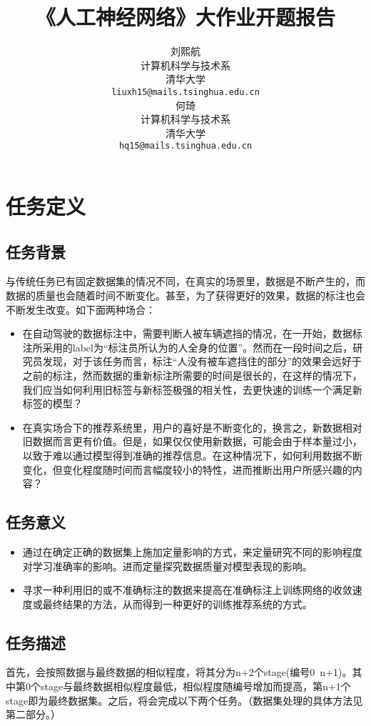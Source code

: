 \documentclass{article}
\title{《人工神经网络》大作业开题报告}
\author{
  刘熙航 \\
  计算机科学与技术系 \\
  清华大学 \\
  \texttt{liuxh15@mails.tsinghua.edu.cn} \\
  \And
  何琦\\
  计算机科学与技术系 \\
  清华大学 \\
  \texttt{hq15@mails.tsinghua.edu.cn} \\
}
\begin{document}
\maketitle



\section{任务定义}
\subsection{任务背景}

与传统任务已有固定数据集的情况不同，在真实的场景里，数据是不断产生的，而数据的质量也会随着时间不断变化。甚至，为了获得更好的效果，数据的标注也会不断发生改变。如下面两种场合：

\begin{itemize}
    \item 在自动驾驶的数据标注中，需要判断人被车辆遮挡的情况，在一开始，数据标注所采用的label为“标注员所认为的人全身的位置”。然而在一段时间之后，研究员发现，对于该任务而言，标注“人没有被车遮挡住的部分”的效果会远好于之前的标注，然而数据的重新标注所需要的时间是很长的，在这样的情况下，我们应当如何利用旧标签与新标签极强的相关性，去更快速的训练一个满足新标签的模型？
    \item 在真实场合下的推荐系统里，用户的喜好是不断变化的，换言之，新数据相对旧数据而言更有价值。但是，如果仅仅使用新数据，可能会由于样本量过小，以致于难以通过模型得到准确的推荐信息。在这种情况下，如何利用数据不断变化，但变化程度随时间而言幅度较小的特性，进而推断出用户所感兴趣的内容？
\end{itemize}

\subsection{任务意义}
\begin{itemize}
    \item 通过在确定正确的数据集上施加定量影响的方式，来定量研究不同的影响程度对学习准确率的影响。进而定量探究数据质量对模型表现的影响。
    \item 寻求一种利用旧的或不准确标注的数据来提高在准确标注上训练网络的收敛速度或最终结果的方法，从而得到一种更好的训练推荐系统的方式。
\end{itemize}

\subsection{任务描述}
首先，会按照数据与最终数据的相似程度，将其分为n+2个stage(编号0~n+1)。其中第0个stage与最终数据相似程度最低，相似程度随编号增加而提高，第n+1个stage即为最终数据集。之后，将会完成以下两个任务。（数据集处理的具体方法见第二部分。）
\end{document}
